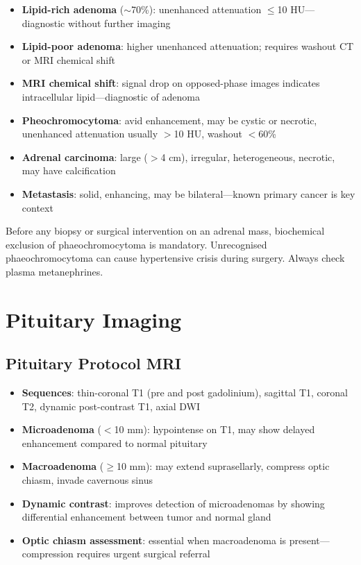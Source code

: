 \begin{itemize}
  \item \textbf{Lipid-rich adenoma} ($\sim$70\%): unenhanced attenuation $\leq$10 HU---diagnostic without further imaging
  \item \textbf{Lipid-poor adenoma}: higher unenhanced attenuation; requires washout CT or MRI chemical shift
  \item \textbf{MRI chemical shift}: signal drop on opposed-phase images indicates intracellular lipid---diagnostic of adenoma
  \item \textbf{Pheochromocytoma}: avid enhancement, may be cystic or necrotic, unenhanced attenuation usually $>$10 HU, washout $<$60\%
  \item \textbf{Adrenal carcinoma}: large ($>$4 cm), irregular, heterogeneous, necrotic, may have calcification
  \item \textbf{Metastasis}: solid, enhancing, may be bilateral---known primary cancer is key context
\end{itemize}

\begin{pearlbox}
Before any biopsy or surgical intervention on an adrenal mass, biochemical exclusion of phaeochromocytoma is mandatory. Unrecognised phaeochromocytoma can cause hypertensive crisis during surgery. Always check plasma metanephrines.
\end{pearlbox}

\section{Pituitary Imaging}

\subsection{Pituitary Protocol MRI}
\begin{itemize}
  \item \textbf{Sequences}: thin-coronal T1 (pre and post gadolinium), sagittal T1, coronal T2, dynamic post-contrast T1, axial DWI
  \item \textbf{Microadenoma} ($<$10 mm): hypointense on T1, may show delayed enhancement compared to normal pituitary
  \item \textbf{Macroadenoma} ($\geq$10 mm): may extend suprasellarly, compress optic chiasm, invade cavernous sinus
  \item \textbf{Dynamic contrast}: improves detection of microadenomas by showing differential enhancement between tumor and normal gland
  \item \textbf{Optic chiasm assessment}: essential when macroadenoma is present---compression requires urgent surgical referral
\end{itemize}

